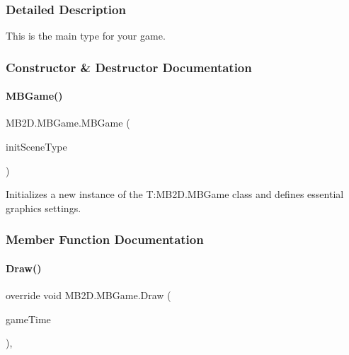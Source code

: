 \subsubsection{Detailed Description}
This is the main type for your game. 



\subsubsection{Constructor \& Destructor Documentation}
\hypertarget{class_m_b2_d_1_1_m_b_game_aa75fd490a977436f16a048d38face6f9}{}\label{class_m_b2_d_1_1_m_b_game_aa75fd490a977436f16a048d38face6f9} 
\paragraph{\texorpdfstring{M\+B\+Game()}{MBGame()}}
{\footnotesize\ttfamily M\+B2\+D.\+M\+B\+Game.\+M\+B\+Game (\begin{DoxyParamCaption}\item[{Type}]{init\+Scene\+Type }\end{DoxyParamCaption})\hspace{0.3cm}{\ttfamily [inline]}}



Initializes a new instance of the T\+:\+M\+B2\+D.\+M\+B\+Game class and defines essential graphics settings. 



\subsubsection{Member Function Documentation}
\hypertarget{class_m_b2_d_1_1_m_b_game_ad791072c4d2a5b23bbaec3542d6facc9}{}\label{class_m_b2_d_1_1_m_b_game_ad791072c4d2a5b23bbaec3542d6facc9} 
\paragraph{\texorpdfstring{Draw()}{Draw()}}
{\footnotesize\ttfamily override void M\+B2\+D.\+M\+B\+Game.\+Draw (\begin{DoxyParamCaption}\item[{Game\+Time}]{game\+Time }\end{DoxyParamCaption})\hspace{0.3cm}{\ttfamily [inline]}, {\ttfamily [protected]}}



